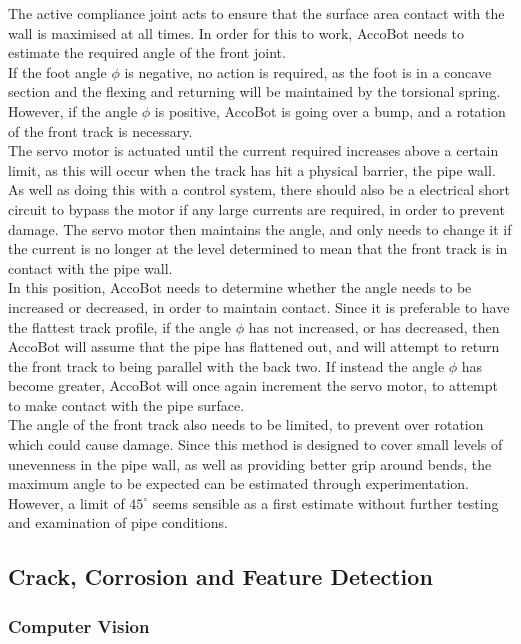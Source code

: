 \documentclass[11pt]{article}		%
\begin{document}
			The active compliance joint acts to ensure that the surface area contact with the wall is maximised at all times.
			In order for this to work, AccoBot needs to estimate the required angle of the front joint.
			\\
			If the foot angle $\phi$ is negative, no action is required, as the foot is in a concave section and the flexing and returning will be maintained by the torsional spring.
			However, if the angle $\phi$ is positive, AccoBot is going over a bump, and a rotation of the front track is necessary.
			\\
			The servo motor is actuated until the current required increases above a certain limit, as this will occur when the track has hit a physical barrier, the pipe wall.
			As well as doing this with a control system, there should also be a electrical short circuit to bypass the motor if any large currents are required, in order to prevent damage.
			The servo motor then maintains the angle, and only needs to change it if the current is no longer at the level determined to mean that the front track is in contact with the pipe wall.
			\\
			In this position, AccoBot needs to determine whether the angle needs to be increased or decreased, in order to maintain contact.
			Since it is preferable to have the flattest track profile, if the angle $\phi$ has not increased, or has decreased, then AccoBot will assume that the pipe has flattened out, and will attempt to return the front track to being parallel with the back two.
			If instead the angle $\phi$ has become greater, AccoBot will once again increment the servo motor, to attempt to make contact with the pipe surface.
			\\
			The angle of the front track also needs to be limited, to prevent over rotation which could cause damage.
			Since this method is designed to cover small levels of unevenness in the pipe wall, as well as providing better grip around bends, the maximum angle to be expected can be estimated through experimentation.
			However, a limit of $45^\circ$ seems sensible as a first estimate without further testing and examination of pipe conditions.
				
		\subsection{Crack, Corrosion and Feature Detection}
		
		\subsubsection{Computer Vision}
		
\end{document}
